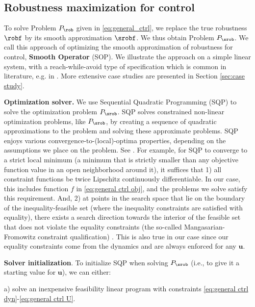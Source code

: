 \subsection{Robustness maximization for control}
\label{sec:toy example}
To solve Problem $P_\rob$ given in \eqref{eq:general_ctrl}, we replace the true robustness $\robf$ by its smooth approximation $\srobf$.
We thus obtain Problem $P_{\srob}$. We call this approach of optimizing the smooth approximation of robustness for control, \textbf{Smooth Operator} (SOP).
We illustrate the approach on a simple linear system, with a reach-while-avoid type of specification which is common in literature, e.g. in \cite{Saha_acc16}. More extensive case studies are presented in Section \ref{sec:case study}.

\textbf{Optimization solver.}
We use Sequential Quadratic Programming (SQP) to solve the optimization problem $P_{\srob}$.
SQP solves constrained non-linear optimization problems, like $P_{\srob}$, by creating a sequence of quadratic approximations to the problem and solving these approximate problems.
SQP enjoys various convergence-to-(local)-optima properties, depending on the assumptions we place on the problem. 
See \cite[Section 2.9]{Polak97_Optim}.
For example, for SQP to converge to a strict local minimum (a minimum that is strictly smaller than any objective function value in an open neighborhood around it), it suffices that 
1) all constraint functions be twice Lipschitz continuously differentiable. 
In our case, this includes function $f$ in \eqref{eq:general ctrl obj}, and the problems we solve satisfy this requirement.
And, 
2) at points in the search space that lie on the boundary of the inequality-feasible set (where the inequality constraints are satisfied with equality), there exists a search direction towards the interior of the feasible set that does not violate the equality constraints (the so-called Mangasarian-Fromowitz constraint qualification) \cite[Assumption 2.9.1]{Polak97_Optim}.
This is also true in our case since our equality constraints come from the dynamics and are always enforced for any $\mathbf{u}$.

\textbf{Solver initialization}.
To initialize SQP when solving $P_{\srob}$ (i.e., to give it a starting value for $\mathbf{u}$), we can either:

a) solve an inexpensive feasibility linear program with constraints \eqref{eq:general ctrl dyn}-\eqref{eq:general ctrl U}. 

